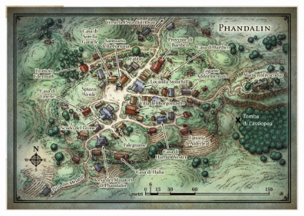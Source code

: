 \documentclass{article}
\begin{document}
       \begin{figure}[ht] 
        \includegraphics[scale=0.75, left]{../Mappe/Phandalin.PNG}
        \end{figure}
\end{document}
